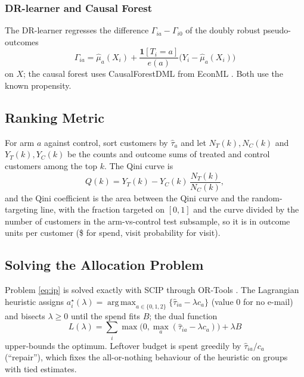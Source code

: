 \documentclass[10pt,twocolumn]{article}
\newcommand{\ind}{\mathbf{1}}
\newcommand{\tauh}{\hat{\tau}}
\newcommand{\muh}{\hat{\mu}}
\DeclareMathOperator*{\argmax}{arg\,max}
\begin{document}
\subsubsection{DR-learner and Causal Forest}
The DR-learner \citep{kennedy2023} regresses the difference $\Gamma_{ia}-\Gamma_{i0}$ of the doubly
robust pseudo-outcomes
\begin{equation}
  \Gamma_{ia} = \muh_a(X_i) + \frac{\ind[T_i=a]}{e(a)}\big(Y_i-\muh_a(X_i)\big)
  \label{eq:gamma}
\end{equation}
on $X$; the causal forest uses CausalForestDML from EconML \citep{econml,athey2019grf}. Both use the
known propensity.

\subsection{Ranking Metric}
For arm $a$ against control, sort customers by $\tauh_a$ and let $N_T(k),N_C(k)$ and $Y_T(k),Y_C(k)$
be the counts and outcome sums of treated and control customers among the top $k$. The Qini curve
\citep{radcliffe2007} is
\begin{equation}
  Q(k) = Y_T(k) - Y_C(k)\,\frac{N_T(k)}{N_C(k)},
\end{equation}
and the Qini coefficient is the area between the Qini curve and the random-targeting line, with
the fraction targeted on $[0,1]$ and the curve divided by the number of customers in the
arm-vs-control test subsample, so it is in outcome units per customer (\$ for spend, visit
probability for visit).

\subsection{Solving the Allocation Problem}
Problem \eqref{eq:ip} is solved exactly with SCIP \citep{scip8} through OR-Tools \citep{ortools}.
The Lagrangian heuristic \citep{everett1963} assigns
$a^\star_i(\lambda)=\argmax_{a\in\{0,1,2\}}\{\tauh_{ia}-\lambda c_a\}$ (value 0 for no e-mail) and
bisects $\lambda\ge 0$ until the spend fits $B$; the dual function
\begin{equation}
  L(\lambda) = \textstyle\sum_i \max\big(0,\max_a(\tauh_{ia}-\lambda c_a)\big) + \lambda B
\end{equation}
upper-bounds the optimum. Leftover budget is spent greedily by $\tauh_{ia}/c_a$ (``repair''), which
fixes the all-or-nothing behaviour of the heuristic on groups with tied estimates.
\end{document}
